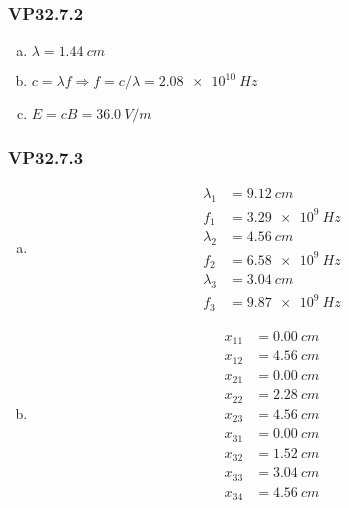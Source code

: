 \documentclass{article}
\begin{document}
\subsubsection{VP32.7.2}

\begin{enumerate}[(a)]
  \item $\lambda = \qty{1.44}{cm}$

  \item $c = \lambda f \Rightarrow f = c / \lambda = \qty{2.08e10}{Hz}$

  \item $E = c B = \qty{36.0}{V/m}$
\end{enumerate}

\subsubsection{VP32.7.3}

\begin{enumerate}[(a)]
  \item

        \begin{align*}
          \lambda_1 & = \qty{9.12}{cm}   \\
          f_1       & = \qty{3.29e9}{Hz} \\
          \lambda_2 & = \qty{4.56}{cm}   \\
          f_2       & = \qty{6.58e9}{Hz} \\
          \lambda_3 & = \qty{3.04}{cm}   \\
          f_3       & = \qty{9.87e9}{Hz}
        \end{align*}

  \item

        \begin{align*}
          x_{11} & = \qty{0.00}{cm} \\
          x_{12} & = \qty{4.56}{cm} \\
          x_{21} & = \qty{0.00}{cm} \\
          x_{22} & = \qty{2.28}{cm} \\
          x_{23} & = \qty{4.56}{cm} \\
          x_{31} & = \qty{0.00}{cm} \\
          x_{32} & = \qty{1.52}{cm} \\
          x_{33} & = \qty{3.04}{cm} \\
          x_{34} & = \qty{4.56}{cm}
        \end{align*}
\end{enumerate}
\end{document}
